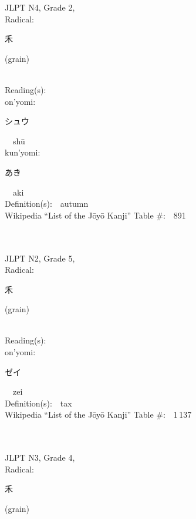 \begin{multicols}{2}
{JLPT N4, Grade 2, \\Radical:\ \ {\begin{CJK}{UTF8}{min} 禾 \end{CJK}} (grain) } \\
Reading(s):\ \ \\
{\hspace*{1em}}on'yomi:\ \ \\
{\hspace*{2em}}{\begin{CJK}{UTF8}{min} シュウ \end{CJK}}\ \ sh\=u\ \ \\
{\hspace*{1em}}kun'yomi:\ \ \\
{\hspace*{2em}}{\begin{CJK}{UTF8}{min} あき \end{CJK}}\ \ aki\ \ \\
Definition(s):\ \ autumn \\
Wikipedia ``List of the J\=oy\=o Kanji'' Table \#:\ \ 891 \\
\ \ \\
{\fontsize{34pt}{40pt}  }\ \ \\  %
{JLPT N2, Grade 5, \\Radical:\ \ {\begin{CJK}{UTF8}{min} 禾 \end{CJK}} (grain) } \\
Reading(s):\ \ \\
{\hspace*{1em}}on'yomi:\ \ \\
{\hspace*{2em}}{\begin{CJK}{UTF8}{min} ゼイ \end{CJK}}\ \ zei\ \ \\
Definition(s):\ \ tax \\
Wikipedia ``List of the J\=oy\=o Kanji'' Table \#:\ \ 1\,137 \\
\ \ \\
{\fontsize{34pt}{40pt}  }\ \ \\  %
{JLPT N3, Grade 4, \\Radical:\ \ {\begin{CJK}{UTF8}{min} 禾 \end{CJK}} (grain) } \\

\end{multicols}
